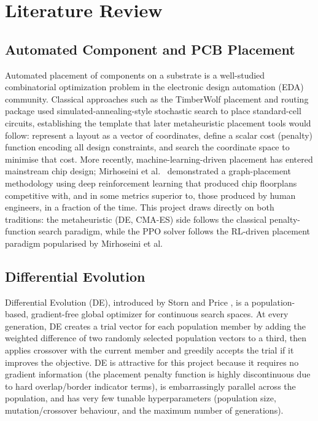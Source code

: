 \documentclass[11pt,a4paper,oneside]{report}
\begin{document}
\chapter{Literature Review}
\label{chap:lit}

\section{Automated Component and PCB Placement}
Automated placement of components on a substrate is a well-studied combinatorial optimization problem in the electronic design automation (EDA) community. Classical approaches such as the TimberWolf placement and routing package \cite{sechen1985timberwolf} used simulated-annealing-style stochastic search to place standard-cell circuits, establishing the template that later metaheuristic placement tools would follow: represent a layout as a vector of coordinates, define a scalar cost (penalty) function encoding all design constraints, and search the coordinate space to minimise that cost. More recently, machine-learning-driven placement has entered mainstream chip design; Mirhoseini et al.\ \cite{mirhoseini2021graph} demonstrated a graph-placement methodology using deep reinforcement learning that produced chip floorplans competitive with, and in some metrics superior to, those produced by human engineers, in a fraction of the time. This project draws directly on both traditions: the metaheuristic (DE, CMA-ES) side follows the classical penalty-function search paradigm, while the PPO solver follows the RL-driven placement paradigm popularised by Mirhoseini et al.

\section{Differential Evolution}
Differential Evolution (DE), introduced by Storn and Price \cite{storn1997de}, is a population-based, gradient-free global optimizer for continuous search spaces. At every generation, DE creates a trial vector for each population member by adding the weighted difference of two randomly selected population vectors to a third, then applies crossover with the current member and greedily accepts the trial if it improves the objective. DE is attractive for this project because it requires no gradient information (the placement penalty function is highly discontinuous due to hard overlap/border indicator terms), is embarrassingly parallel across the population, and has very few tunable hyperparameters (population size, mutation/crossover behaviour, and the maximum number of generations).
\end{document}

